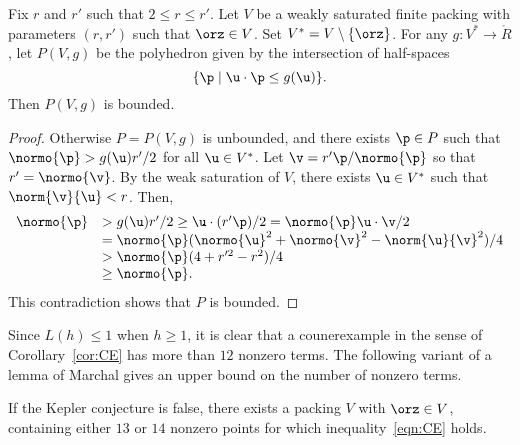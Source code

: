 \begin{lemma}\label{lemma:poly-bounded} 
Fix $r$ and $r'$ such that $2\le r\le r'$.
Let $ V$ be a weakly saturated finite packing with parameters $(r,r')$ 
such that $\orz\in  V$.
Set $ V^*= V\setminus\{\orz\}$.
For any $g: V^*\to\ring{R}$, let $P( V,g)$ be the
polyhedron given by the intersection of half-spaces
\begin{displaymath}
\{\p \mid  \u\cdot \p \le g( \u)\}.
\end{displaymath}
Then $P( V,g)$ is bounded.
\end{lemma}
%

\begin{proof} Otherwise $P=P( V,g)$ is unbounded, and there exists
$\p\in P$ such that $\normo{\p} > g( \u) r'/2$ for all $ \u\in V^*$.
Let $\v = r' \p/\normo{\p}$ so that $r'=\normo{\v}$.  By the weak
saturation of $ V$, there exists $ \u\in V^*$ such that $\norm{\v}{
\u}<r$.  Then,
\begin{displaymath}
\begin{array}{lll}
\normo{\p} &> g( \u) r'/2 \ge  \u\cdot (r' \p)/2 = \normo{\p}  \u\cdot \v /2\\
&= \normo{\p} (\normo{ \u}^2 + \normo{\v}^2 - \norm{ \u}{\v}^2)/4\\
&> \normo{\p}(4+r'^2-r^2)/4\\
&\ge \normo{\p}.
\end{array}
\end{displaymath}
This contradiction shows that $P$ is bounded.
\end{proof}




Since $L(h)\le 1$ when $h\ge1$, it is clear that a counerexample in
the sense of Corollary~\ref{cor:CE} has more than $12$ nonzero terms.
The following variant of a lemma of Marchal gives an upper bound on
the number of nonzero terms.


\begin{lemma}\label{lemma:13-14}  %
If the Kepler conjecture is false, there exists a packing $ V$ with
$\orz\in V$, containing either $13$ or $14$ nonzero points for which
inequality~\ref{eqn:CE} holds.
\end{lemma}


